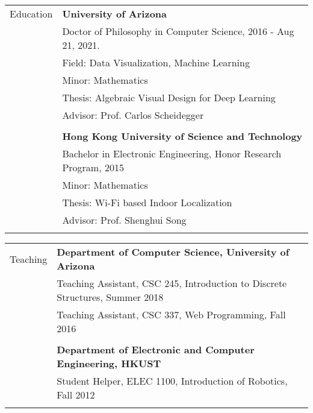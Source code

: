 \documentclass[letterpaper,11pt,oneside]{article}
\begin{document}
\noindent \begin{tabular}{@{} l l}
\Large{Education}    & \textbf{University of Arizona} \\
    & Doctor of Philosophy in Computer Science, 2016 - Aug 21, 2021. \\
    & Field: Data Visualization, Machine Learning \\
    & Minor: Mathematics \\
    & Thesis: Algebraic Visual Design for Deep Learning \\
    & Advisor: Prof. Carlos Scheidegger \\
    & \\
    & \textbf{Hong Kong University of Science and Technology} \\
    & Bachelor in Electronic Engineering, Honor Research Program, 2015 \\
    & Minor: Mathematics \\
    & Thesis: Wi-Fi based Indoor Localization \\
    & Advisor: Prof. Shenghui Song \\
    & \\
\end{tabular}


\noindent \begin{tabular}{@{} l l}
\Large{Teaching}   & \textbf{Department of Computer Science, University of Arizona} \\
    & Teaching Assistant, CSC 245, Introduction to Discrete Structures, Summer 2018 \\
    & Teaching Assistant, CSC 337, Web Programming, Fall 2016 \\
    & \\
    &\textbf{Department of Electronic and Computer Engineering, HKUST} \\
    & Student Helper, ELEC 1100, Introduction of Robotics, Fall 2012 \\
    & \\
\end{tabular}
\end{document}
